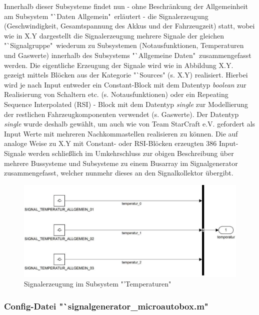 \documentclass[fontsize = 12pt, paper = a4]{scrreprt}
\begin{document}
Innerhalb dieser Subsysteme findet nun - ohne Beschränkung der Allgemeinheit am Subsystem "`Daten Allgemein"\ erläutert - die Signalerzeugung (Geschwindigkeit, Gesamtspannung des Akkus und der Fahrzeugzeit) statt, wobei wie in X.Y dargestellt die Signalerzeugung mehrere Signale der gleichen "`Signalgruppe"\ wiederum zu Subsystemen (Notausfunktionen, Temperaturen und Gaswerte)  innerhalb des Subsystems "`Allgemeine Daten"\ zusammengefasst werden. Die eigentliche Erzeugung der Signale wird wie in Abbildung X.Y. gezeigt mittels Blöcken aus der Kategorie "`Sources" (s. X.Y) realisiert. Hierbei wird je nach Input entweder ein Constant-Block mit dem Datentyp \textit{boolean} zur Realisierung von Schaltern etc. (s. Notausfunktionen) oder ein Repeating Sequence Interpolated (RSI) - Block mit dem Datentyp \textit{single} zur Modellierung der restlichen Fahrzeugkomponenten verwendet (s. Gaswerte). Der Datentyp \textit{single} wurde deshalb gewählt, um auch wie von Team StarCraft e.V. gefordert als Input Werte mit mehreren Nachkommastellen realisieren zu können. Die auf analoge Weise zu X.Y mit Constant- oder RSI-Blöcken erzeugten 386 Input-Signale werden schließlich im Umkehrschluss zur obigen Beschreibung über mehrere Bussysteme und Subsysteme zu einem Busarray im Signalgenerator zusammengefasst, welcher nunmehr dieses an den Signalkollektor übergibt.   

\newpage

  
\begin{figure}[h]
\centering
\includegraphics[scale = 0.65]{subsubtemp}
\caption{Signalerzeugung im Subsystem "'Temperaturen"}
\end{figure}


\subsubsection{Config-Datei "`signalgenerator\_microautobox.m" }
\end{document}
